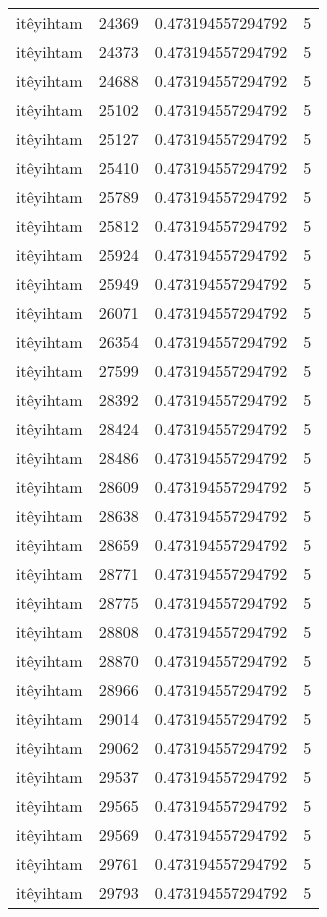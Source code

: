\begin{longtable}{llll}
itêyihtam & 24369 & 0.473194557294792 & 5 \\
itêyihtam & 24373 & 0.473194557294792 & 5 \\
itêyihtam & 24688 & 0.473194557294792 & 5 \\
itêyihtam & 25102 & 0.473194557294792 & 5 \\
itêyihtam & 25127 & 0.473194557294792 & 5 \\
itêyihtam & 25410 & 0.473194557294792 & 5 \\
itêyihtam & 25789 & 0.473194557294792 & 5 \\
itêyihtam & 25812 & 0.473194557294792 & 5 \\
itêyihtam & 25924 & 0.473194557294792 & 5 \\
itêyihtam & 25949 & 0.473194557294792 & 5 \\
itêyihtam & 26071 & 0.473194557294792 & 5 \\
itêyihtam & 26354 & 0.473194557294792 & 5 \\
itêyihtam & 27599 & 0.473194557294792 & 5 \\
itêyihtam & 28392 & 0.473194557294792 & 5 \\
itêyihtam & 28424 & 0.473194557294792 & 5 \\
itêyihtam & 28486 & 0.473194557294792 & 5 \\
itêyihtam & 28609 & 0.473194557294792 & 5 \\
itêyihtam & 28638 & 0.473194557294792 & 5 \\
itêyihtam & 28659 & 0.473194557294792 & 5 \\
itêyihtam & 28771 & 0.473194557294792 & 5 \\
itêyihtam & 28775 & 0.473194557294792 & 5 \\
itêyihtam & 28808 & 0.473194557294792 & 5 \\
itêyihtam & 28870 & 0.473194557294792 & 5 \\
itêyihtam & 28966 & 0.473194557294792 & 5 \\
itêyihtam & 29014 & 0.473194557294792 & 5 \\
itêyihtam & 29062 & 0.473194557294792 & 5 \\
itêyihtam & 29537 & 0.473194557294792 & 5 \\
itêyihtam & 29565 & 0.473194557294792 & 5 \\
itêyihtam & 29569 & 0.473194557294792 & 5 \\
itêyihtam & 29761 & 0.473194557294792 & 5 \\
itêyihtam & 29793 & 0.473194557294792 & 5 \\

\end{longtable}
